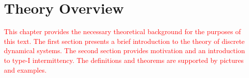 \chapter{Theory Overview}

\textcolor{red}{
This chapter provides the necessary theoretical background for the purposes of this text.
The first section presents a brief introduction to the theory of discrete dynamical systems.
The second section provides motivation and an introduction to type-I intermittency.
The definitions and theorems are supported by pictures and examples.
}




\endinput